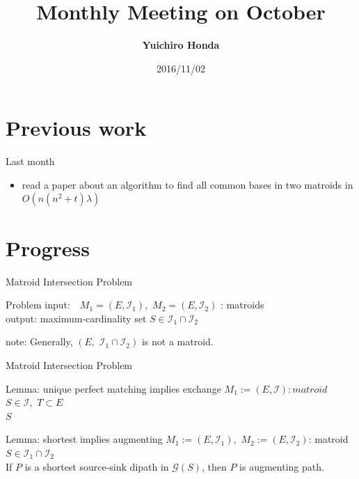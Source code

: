 \documentclass[11pt,xcolor=dvipsnames,table,dvipdfmx]{beamer}
\title{Monthly Meeting on October}
\author{\textbf{Yuichiro Honda}}
\date{2016/11/02}
\institute{Morita lab. M1}
\begin{document}
\maketitle

\section{Previous work}
\begin{frame}{Last month}
 \begin{itemize}
  \item read a paper about an algorithm to find all common bases in two matroids in $O(n(n^2+t)\lambda)$
 \end{itemize}
\end{frame}

\section{Progress}
\begin{frame}{Matroid Intersection Problem}
 \begin{block}{Problem}
  input: \,\, $M_1 = (E, \mathcal{I}_1),\,\,M_2 = (E, \mathcal{I}_2)$ : matroids\\
  output: maximum-cardinality set $S \in \mathcal{I}_1 \cap \mathcal{I}_2$
 \end{block}
 note: Generally, $(E,\,\,\mathcal{I}_1 \cap \mathcal{I}_2)$ is not a matroid.
\end{frame}

\begin{frame}{Matroid Intersection Problem}
 \begin{block}{Lemma: unique perfect matching implies exchange}
  $M_1 := (E, \mathcal{I}): matroid$\\
  $S \in \mathcal{I},\,\,T \subset E$\\
  $S$
 \end{block}
 \begin{block}{Lemma: shortest implies augmenting}
  $M_1 := (E, \mathcal{I}_1),\,\, M_2 := (E, \mathcal{I}_2)$: matroid\\
  $S \in \mathcal{I}_1 \cap \mathcal{I}_2$\\
  If $P$ is a shortest source-sink dipath in $\mathcal{G}(S)$, then $P$ is augmenting path.
 \end{block}
\end{frame}
\end{document}
